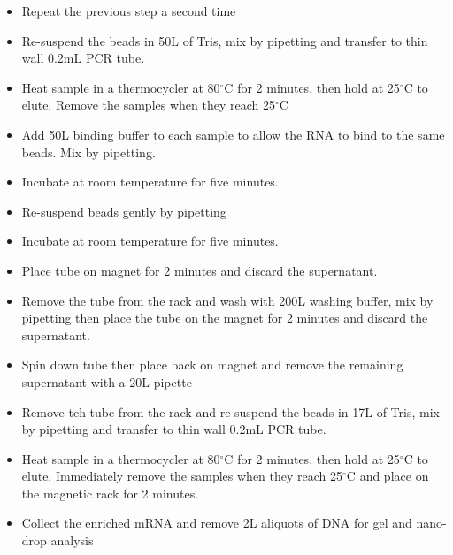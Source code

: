 \documentclass[a4paper]{article}
\begin{document}
\begin{itemize}
            \item Repeat the previous step a second time
            
            \item Re-suspend the beads in 50\textmu L of Tris, mix by pipetting and transfer to thin wall 0.2mL PCR tube.
            
            \item Heat sample in a thermocycler at 80$^{\circ}$C for 2 minutes, then hold at 25$^{\circ}$C to elute. Remove the samples when they reach 25$^{\circ}$C
            
            \item Add 50\textmu L binding buffer to each sample to allow the RNA to bind to the same beads. Mix by pipetting.
            
            \item Incubate at room temperature for five minutes.
            
            \item Re-suspend beads gently by pipetting 
            
            \item Incubate at room temperature for five minutes.
            
            \item Place tube on magnet for 2 minutes and discard the supernatant.
            
            \item Remove the tube from the rack and wash with 200\textmu L washing buffer, mix by pipetting then place the tube on the magnet for 2 minutes and discard the supernatant.
            
            \item Spin down tube then place back on magnet and remove the remaining supernatant with a 20\textmu L pipette
            
            \item Remove teh tube from the rack and re-suspend the beads in 17\textmu L of Tris, mix by pipetting and transfer to thin wall 0.2mL PCR tube.
            
             \item Heat sample in a thermocycler at 80$^{\circ}$C for 2 minutes, then hold at 25$^{\circ}$C to elute. Immediately remove the samples when they reach 25$^{\circ}$C and place on the magnetic rack for 2 minutes.
             
             \item Collect the enriched mRNA and remove 2\textmu L aliquots of DNA for gel and nano-drop analysis         
    	\end{itemize}
\end{document}

